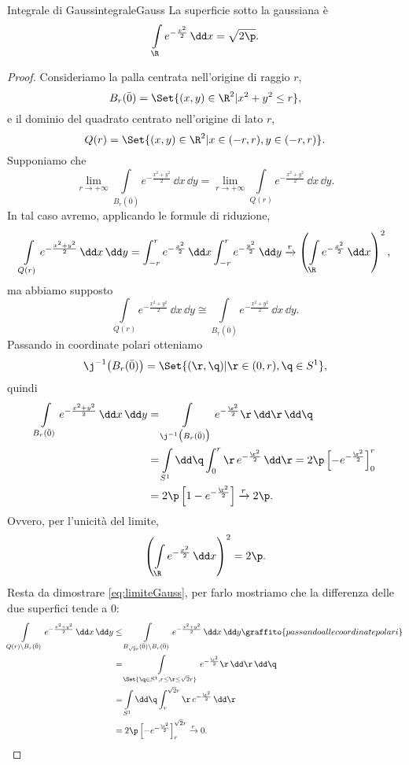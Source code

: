 \begin{prop}{Integrale di Gauss}{integraleGauss}
	La superficie sotto la gaussiana è
	\[
		\int\limits_\R e^{-\frac{x^2}{2}}\,\dd x = \sqrt{2\p}.
	\]
\end{prop}

\begin{proof}
	Consideriamo la palla centrata nell'origine di raggio \(r\),
	\[
		B_r(\bar{0}) = \Set{(x,y)\in\R^2 | x^2+y^2 \le r},
	\]
	e il dominio del quadrato centrato nell'origine di lato \(r\),
	\[
		Q(r) = \Set{(x,y)\in\R^2 | x\in(-r,r),y\in(-r,r)}.
	\]
	Supponiamo che
	\begin{equation}\label{eq:limiteGauss}
		\lim_{r\to+\infty} \int\limits_{B_r(\bar{0})} e^{- \frac{x^2+y^2}{2}}\,\dd x\,\dd y = \lim_{r\to+\infty}\int\limits_{Q(r)} e^{- \frac{x^2+y^2}{2}}\,\dd x\,\dd y.\tag{\(*\)}
	\end{equation}
	In tal caso avremo, applicando le formule di riduzione,
	\[
		\int\limits_{Q(r)}e^{- \frac{x^2+y^2}{2}}\,\dd x\,\dd y = \int_{-r}^r e^{-\frac{x^2}{2}}\,\dd x \int_{-r}^r e^{-\frac{y^2}{2}}\,\dd y \xrightarrow{r} \left( \int\limits_\R e^{-\frac{x^2}{2}}\,\dd x \right)^2,
	\]
	ma abbiamo supposto
	\[
		\int\limits_{Q(r)}e^{-\frac{x^2+y^2}{2}}\,\dd x\,\dd y \cong \int\limits_{B_r(\bar{0})} e^{-\frac{x^2+y^2}{2}}\,\dd x\,\dd y.
	\]
	Passando in coordinate polari otteniamo
	\[
		\j^{-1}\big(B_r(\bar{0})\big) = \Set{(\r,\q) | \r\in(0,r),\q\in S^1},
	\]
	quindi
	\[
		\begin{split}
			\int\limits_{B_r(\bar{0})} e^{-\frac{x^2+y^2}{2}}\,\dd x\,\dd y & =\int\limits_{\j^{-1}\big(B_r(\bar{0})\big)} e^{-\frac{\r^2}{2}}\r\,\dd\r\,\dd\q\\
			& = \int\limits_{S^1}\dd\q \int_0^r \r\,e^{-\frac{\r^2}{2}}\,\dd\r = 2\p \left[ -e^{-\frac{\r^2}{2}} \right]_0^r\\
			& = 2\p \left[ 1-e^{-\frac{\r^2}{2}} \right] \xrightarrow{r} 2\p.
		\end{split}
	\]
	Ovvero, per l'unicità del limite,
	\[
		\left( \int\limits_\R e^{-\frac{x^2}{2}}\,\dd x \right)^2 = 2\p.
	\]
	Resta da dimostrare \eqref{eq:limiteGauss}, per farlo mostriamo che la differenza delle due superfici tende a \(0\):
	\[
		\begin{split}
			\int\limits_{Q(r)\setminus B_r(\bar{0})} e^{- \frac{x^2+y^2}{2}}\,\dd x\,\dd y & \le \int\limits_{B_{\sqrt{2}r}(\bar{0})\setminus B_r(\bar{0})}e^{-\frac{x^2+y^2}{2}}\,\dd x\,\dd y\graffito{passando alle coordinate polari}\\
			& = \int\limits_{\Set{\q\in S^1,r \le \r \le \sqrt{2}r}}e^{-\frac{\r^2}{2}}\r\,\dd\r\,\dd\q\\
			& = \int\limits_{S^1} \dd\q \int_r^{\sqrt{2}r}\r\,e^{-\frac{\r^2}{2}}\,\dd\r\\
			& = 2\p \left[ -e^{-\frac{\r^2}{2}} \right]_r^{\sqrt{2}r}\xrightarrow{r} 0.\qedhere
		\end{split}
	\]
\end{proof}

